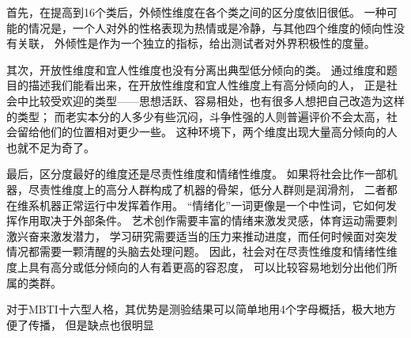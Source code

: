 \documentclass[UTF8]{ctexart}
\begin{document}
首先，在提高到16个类后，外倾性维度在各个类之间的区分度依旧很低。
一种可能的情况是，一个人对外的性格表现为热情或是冷静，与其他四个维度的倾向性没有关联，
外倾性是作为一个独立的指标，给出测试者对外界积极性的度量。\par
其次，开放性维度和宜人性维度也没有分离出典型低分倾向的类。
通过维度和题目的描述我们能看出来，在开放性维度和宜人性维度上有高分倾向的人，
正是社会中比较受欢迎的类型——思想活跃、容易相处，也有很多人想把自己改造为这样的类型；
而老实本分的人多少有些沉闷，斗争性强的人则普遍评价不会太高，社会留给他们的位置相对更少一些。
这种环境下，两个维度出现大量高分倾向的人也就不足为奇了。\par
最后，区分度最好的维度还是尽责性维度和情绪性维度。
如果将社会比作一部机器，尽责性维度上的高分人群构成了机器的骨架，低分人群则是润滑剂，
二者都在维系机器正常运行中发挥着作用。
“情绪化”一词更像是一个中性词，它如何发挥作用取决于外部条件。
艺术创作需要丰富的情绪来激发灵感，体育运动需要刺激兴奋来激发潜力，
学习研究需要适当的压力来推动进度，而任何时候面对突发情况都需要一颗清醒的头脑去处理问题。
因此，社会对在尽责性维度和情绪性维度上具有高分或低分倾向的人有着更高的容忍度，
可以比较容易地划分出他们所属的类群。\par
对于MBTI十六型人格，其优势是测验结果可以简单地用4个字母概括，极大地方便了传播，
但是缺点也很明显
\end{document}
